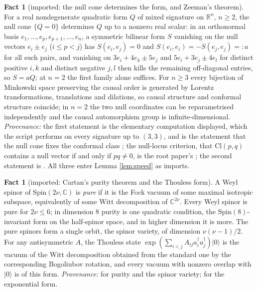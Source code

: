 \documentclass[11pt]{article}
\theoremstyle{definition}
\newtheorem{fact}[theorem]{Fact}
\newcommand{\Cl}{\mathrm{Cl}}
\newcommand{\R}{\mathbb{R}}
\newcommand{\C}{\mathbb{C}}
\begin{document}
\begin{fact}[imported: the null cone determines the form, and Zeeman's theorem]\label{fact:cone}
For a real nondegenerate quadratic form $Q$ of mixed signature on $\R^{n}$, $n \geq 2$, the null cone $\{Q = 0\}$ determines $Q$ up to a nonzero real scalar: in an orthonormal basis $e_{1}, \dots, e_{p}, e_{p+1}, \dots, e_{n}$, a symmetric bilinear form $S$ vanishing on the null vectors $e_{i} \pm e_{j}$ ($i \leq p < j$) has $S(e_{i}, e_{j}) = 0$ and $S(e_{i}, e_{i}) = -S(e_{j}, e_{j}) =: a$ for all such pairs, and vanishing on $3e_{i} + 4e_{k} \pm 5e_{j}$ and $5e_{i} + 3e_{j} \pm 4e_{l}$ for distinct positive $i, k$ and distinct negative $j, l$ then kills the remaining off-diagonal entries, so $S = aQ$; at $n = 2$ the first family alone suffices. For $n \geq 3$ every bijection of Minkowski space preserving the causal order is generated by Lorentz transformations, translations and dilations, so causal structure and conformal structure coincide; in $n = 2$ the two null coordinates can be reparametrised independently and the causal automorphism group is infinite-dimensional. \emph{Provenance:} the first statement is the elementary computation displayed, which the script performs on every signature up to $(3,3)$, and is the statement that the null cone fixes the conformal class \cite{HawkingEllis1973}; the null-locus criterion, that $\Cl(p,q)$ contains a null vector if and only if $pq \neq 0$, is the root paper's \cite[Prop.~3.3]{ButlerT1}; the second statement is \cite{Zeeman1964}. All three enter Lemma \ref{lem:speed} as imports.
\end{fact}

\begin{fact}[imported: Cartan's purity theorem and the Thouless form]\label{fact:cartan}
A Weyl spinor of $\mathrm{Spin}(2\nu, \C)$ is \emph{pure} if it is the Fock vacuum of some maximal isotropic subspace, equivalently of some Witt decomposition of $\C^{2\nu}$. Every Weyl spinor is pure for $2\nu \leq 6$; in dimension $8$ purity is one quadratic condition, the $\mathrm{Spin}(8)$-invariant form on the half-spinor space, and in higher dimension it is more. The pure spinors form a single orbit, the spinor variety, of dimension $\nu(\nu - 1)/2$. For any antisymmetric $A$, the Thouless state $\exp(\sum_{i<j}A_{ij}a^{\dagger}_{i}a^{\dagger}_{j})|0\rangle$ is the vacuum of the Witt decomposition obtained from the standard one by the corresponding Bogoliubov rotation, and every vacuum with nonzero overlap with $|0\rangle$ is of this form. \emph{Provenance:} \cite{Cartan1938, Chevalley1954} for purity and the spinor variety; \cite{Thouless1960} for the exponential form.
\end{fact}
\end{document}
